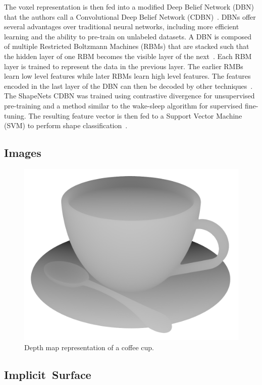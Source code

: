 The voxel representation is then fed into a modified Deep Belief Network (DBN) that the authors call a Convolutional Deep Belief Network (CDBN)~\cite{Wu2015}. DBNs offer several advantages over traditional neural networks, including more efficient learning and the ability to pre-train on unlabeled datasets. A DBN is composed of multiple Restricted Boltzmann Machines (RBMs) that are stacked such that the hidden layer of one RBM becomes the visible layer of the next~\cite{Aljabery2020}. Each RBM layer is trained to represent the data in the previous layer. The earlier RMBs learn low level features while later RBMs learn high level features. The features encoded in the last layer of the DBN can then be decoded by other techniques~\cite{McAfee2008}. The ShapeNets CDBN was trained using contrastive divergence for unsupervised pre-training and a  method similar to the wake-sleep algorithm for supervised fine-tuning. The resulting feature vector is then fed to a Support Vector Machine (SVM) to perform shape classification~\cite{Wu2015}. 


\subsection{Images}

\begin{figure}[h]
	\centering
	\includegraphics[scale=0.2]{Images/Depth Map Cup}
	\caption{Depth map representation of a coffee cup.}
	\label{fig:depth_map_cup}
\end{figure}

\subsection{Implicit~Surface}
\label{subsec:implicit_surface}

